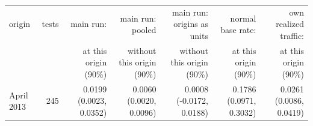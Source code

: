 \begin{tabular}{lrrrrrr}
\toprule
origin & tests & main run: & main run: pooled & main run: origins as units & normal base rate: & own realized traffic: \\
 & & at this origin (90\%) & without this origin (90\%) & without this origin (90\%) & at this origin (90\%) & at this origin (90\%) \\
\midrule
April 2013 & 245 & 0.0199 (0.0023, 0.0352) & 0.0060 (0.0020, 0.0096) & 0.0008 (-0.0172, 0.0188) & 0.1786 (0.0971, 0.3032) & 0.0261 (0.0086, 0.0419) \\

\end{tabular}

